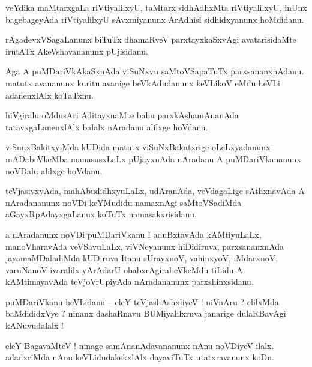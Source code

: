 \documentclass{article}
\begin{document}
\begin{mn}%
veYdika maMtarxgaLa riVtiyalilxyU, taMtarx sidhAdhxMta riVtiyalilxyU, inUnx bagebageyAda 
riVtiyalilxyU sAvxmiyanunx ArAdhisi sidhidxyanunx hoMdidanu.
\end{mn}

\begin{mn}%
rAgadevxVSagaLanunx biTuTx dhamaRveV parxtayxkaSxvAgi avatarisidaMte irutATx AkeVshavananunx 
pUjisidanu.
\end{mn}

\begin{mn}%
Aga A puMDariVkAkaSxnAda viSuNxvu saMtoVSapaTuTx parxsananxnAdanu. matutx avananunx kuritu avanige 
beVkAdudanunx keVLikoV eMdu heVLi adanenxlAlx koTaTxnu.
\end{mn}

\begin{mn}%
hiVgiralu oMdusAri AditayxnaMte bahu parxkAshamAnanAda tatavxgaLanenxlAlx balalx nAradanu alilxge 
hoVdanu.
\end{mn}

\begin{mn}%
viSunxBakitxyiMda kUDida matutx viSuNxBakatxrige oLeLxyadanunx mADabeVkeMba manasusxLaLx pUjayxnAda 
nAradanu A puMDariVkananunx noVDalu alilxge hoVdanu.
\end{mn}

\begin{mn}%
teVjasivxyAda, mahAbudidhxyuLaLx, udAranAda, veVdagaLige sAthxnavAda A nAradananunx noVDi keYMudidu 
namaxnAgi saMtoVSadiMda aGayxRpAdayxgaLanux koTuTx namasakxrisidanu.
\end{mn}

\begin{mn}%
a nAradanunx noVDi puMDariVkanu I aduBxtavAda kAMtiyuLaLx, manoVharavAda veVSavuLaLx, viVNeyanunx 
hiDidiruva, parxsananxnAda jayamaMDaladiMda kUDiruva Itanu sUrayxnoV, vahinxyoV, iMdarxnoV, 
varuNanoV ivaralilx yArAdarU obabxrAgirabeVkeMdu tiLidu A kAMtimayavAda teVjoVrUpiyAda 
nAradananunx parxshinxsidanu.
\end{mn}

\begin{mn}%
puMDariVkanu heVLidanu -- eleY teVjashAshxliyeV ! niVnAru ? elilxMda baMdididxVye ? ninanx 
dashaRnavu BUMiyalilxruva janarige dulaRBavAgi kANuvudalalx !
\end{mn}

\begin{mn}%
eleY BagavaMteV ! ninage samAnanAdavananunx nAnu noVDiyeV ilalx. adadxriMda nAnu keVLidudakekxlAlx 
dayaviTuTx utatxravanunx koDu.
\end{mn}
\end{document}

